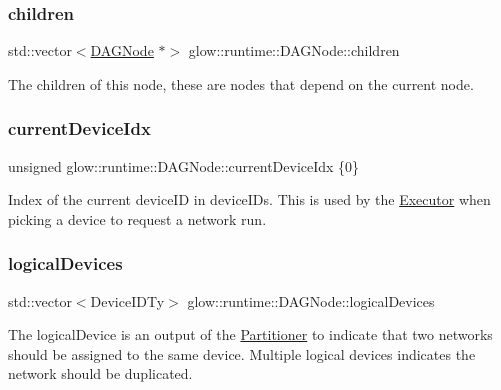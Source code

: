 \subsubsection{\texorpdfstring{children}{children}}
{\footnotesize\ttfamily std\+::vector$<$\hyperlink{structglow_1_1runtime_1_1_d_a_g_node}{D\+A\+G\+Node} $\ast$$>$ glow\+::runtime\+::\+D\+A\+G\+Node\+::children}

The children of this node, these are nodes that depend on the current node. \mbox{\label{structglow_1_1runtime_1_1_d_a_g_node_a63142a24d84bd3397f08a6aab8b4e26b}} 
\subsubsection{\texorpdfstring{current\+Device\+Idx}{currentDeviceIdx}}
{\footnotesize\ttfamily unsigned glow\+::runtime\+::\+D\+A\+G\+Node\+::current\+Device\+Idx \{0\}}

Index of the current device\+ID in device\+I\+Ds. This is used by the \hyperlink{classglow_1_1runtime_1_1_executor}{Executor} when picking a device to request a network run. \mbox{\label{structglow_1_1runtime_1_1_d_a_g_node_a8954611af692b9637220ab94417fa67b}} 
\subsubsection{\texorpdfstring{logical\+Devices}{logicalDevices}}
{\footnotesize\ttfamily std\+::vector$<$Device\+I\+D\+Ty$>$ glow\+::runtime\+::\+D\+A\+G\+Node\+::logical\+Devices}

The logical\+Device is an output of the \hyperlink{classglow_1_1_partitioner}{Partitioner} to indicate that two networks should be assigned to the same device. Multiple logical devices indicates the network should be duplicated. \mbox{\label{structglow_1_1runtime_1_1_d_a_g_node_a9374ab2aed40d204c22539b94c3adcc5}} 
